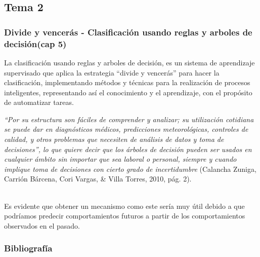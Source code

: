 \documentclass[10pt]{beamer}
\begin{document}
\subsection{Tema 2}
\begin{frame}
\frametitle{Divide y vencerás - Clasificación usando reglas y arboles de decisión(cap 5)}
La clasificación usando reglas y arboles de decisión, es un sistema de aprendizaje supervisado que aplica la estrategia ``divide y vencerás'' para hacer la clasificación, implementando métodos y técnicas para la realización de procesos inteligentes, representando así el conocimiento y el aprendizaje, con el propósito de automatizar tareas.

\textit{``Por su estructura son fáciles de comprender y analizar; su utilización cotidiana se puede dar en diagnósticos médicos, predicciones meteorológicas, controles de calidad, y otros problemas que necesiten de análisis de datos y toma de decisiones'', lo que quiere decir que los árboles de decisión pueden ser usados en cualquier ámbito sin importar que sea laboral o personal, siempre y cuando implique toma de decisiones con cierto grado de incertidumbre} (Calancha Zuniga, Carrión Bárcena, Cori Vargas, \& Villa Torres, 2010, pág. 2).

~\\Es evidente que obtener un mecanismo como este sería muy útil debido a que podríamos predecir comportamientos futuros a partir de los comportamientos observados en el pasado.
\end{frame}

\begin{frame}
  \frametitle{Bibliografía}
  
\nocite{A1, L, EyH, A0}
  
  
  
\end{frame}
\end{document}
